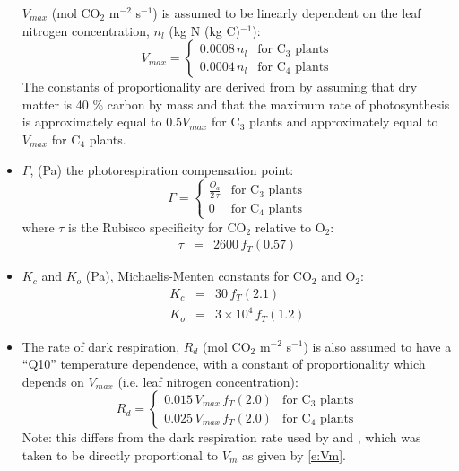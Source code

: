 \documentclass[a4paper]{article}
\begin{document}
\begin{itemize}
$V_{max}$ (mol CO$_{2}$ m$^{-2}$ s$^{-1}$) is assumed to be linearly
dependent on the leaf nitrogen concentration, $n_{l}$ (kg N (kg
C)$^{-1}$):
\begin{equation}
V_{max} = \left \{ \begin{array}{lll}
             0.0008 \, n_{l} & \mbox{for C$_{3}$ plants}  \nonumber \\ [5mm]
             0.0004 \, n_{l} & \mbox{for C$_{4}$ plants} 
             \end{array} \right.
\end{equation}
The constants of proportionality are derived from \citet{Sch94} by
assuming that dry matter is 40 \% carbon by mass and that the maximum
rate of photosynthesis is approximately equal to $0.5 V_{max}$ for
C$_{3}$ plants and approximately equal to $V_{max}$ for C$_{4}$
plants.
\item $\Gamma$, (Pa) the photorespiration compensation point:
\begin{equation}
\Gamma = \left \{ \begin{array}{lll}
  \displaystyle{\frac{O_{a}}{2 \, \tau}} & \mbox{for C$_{3}$ plants}
                                              \nonumber \\ [5mm]
              0 & \mbox{for C$_{4}$ plants} 
             \end{array} \right.
\end{equation}
where $\tau$ is the Rubisco specificity for CO$_{2}$ relative to
O$_{2}$:
\begin{eqnarray}
\tau &=& 2600 \, f_{T}(0.57)
\end{eqnarray}
\item $K_{c}$ and $K_{o}$ (Pa), Michaelis-Menten constants for
CO$_{2}$ and O$_{2}$:
\begin{eqnarray}
K_{c} &=& 30 \, f_{T}(2.1) \\
K_{o} &=& 3 \times 10^{4} \, f_{T}(1.2)
\end{eqnarray}
\item The rate of dark respiration, $R_d$ (mol CO$_{2}$ m$^{-2}$
s$^{-1}$) is also assumed to have a ``Q10'' temperature dependence,
with a constant of proportionality which depends on $V_{max}$ (i.e.
leaf nitrogen concentration):
\begin{equation}
R_{d} = \left \{ \begin{array}{lll}
                0.015 \, V_{max} \, f_{T}(2.0) & \mbox{for C$_{3}$ plants}  \nonumber \\ [5mm]
                0.025 \, V_{max} \, f_{T}(2.0) & \mbox{for C$_{4}$ plants}  
             \end{array} \right.
\end{equation}
Note: this differs from the dark respiration rate used by \citet{Cox98}
and \citet{Cox99}, which was taken to be directly proportional to
$V_{m}$ as given by \eqref{e:Vm}.
\end{itemize}
\end{document}
